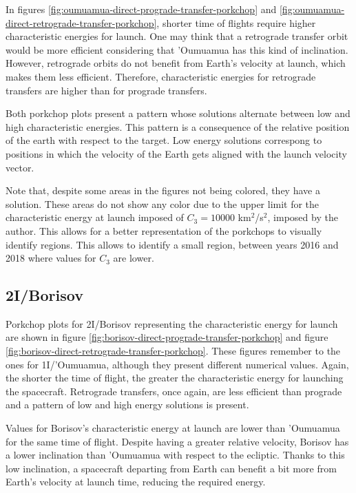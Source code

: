 In figures \ref{fig:oumuamua-direct-prograde-transfer-porkchop} and
\ref{fig:oumuamua-direct-retrograde-transfer-porkchop}, shorter time of flights
require higher characteristic energies for launch. One may think that a
retrograde transfer orbit would be more efficient considering that 'Oumuamua has
this kind of inclination. However, retrograde orbits do not benefit from Earth's
velocity at launch, which makes them less efficient. Therefore, characteristic
energies for retrograde transfers are higher than for prograde transfers.

Both porkchop plots present a pattern whose solutions alternate between low and
high characteristic energies. This pattern is a consequence of the relative
position of the earth with respect to the target. Low energy solutions
correspong to positions in which the velocity of the Earth gets aligned with the
launch velocity vector.

Note that, despite some areas in the figures not being colored, they have a
solution. These areas do not show any color due to the upper limit for the characteristic
energy at launch imposed of $C_3 = 10000$ km$^2$/s$^2$, imposed by the
author. This allows for a better representation of the porkchops to visually
identify regions. This allows to identify a small region, between years 2016 and
2018 where values for $C_3$ are lower.

\subsection{2I/Borisov}

Porkchop plots for 2I/Borisov representing the characteristic energy for launch
are shown in figure \ref{fig:borisov-direct-prograde-transfer-porkchop} and
figure \ref{fig:borisov-direct-retrograde-transfer-porkchop}. These figures
remember to the ones for 1I/'Oumuamua, although they present different numerical
values. Again, the shorter the time of flight, the greater the characteristic
energy for launching the spacecraft. Retrograde transfers, once again, are less
efficient than prograde and a pattern of low and high energy solutions is
present.

Values for Borisov's characteristic energy at launch are lower than 'Oumuamua
for the same time of flight. Despite having a greater relative velocity, Borisov
has a lower inclination than 'Oumuamua with respect to the ecliptic. Thanks to
this low inclination, a spacecraft departing from Earth can benefit a bit more
from Earth's velocity at launch time, reducing the required energy.

